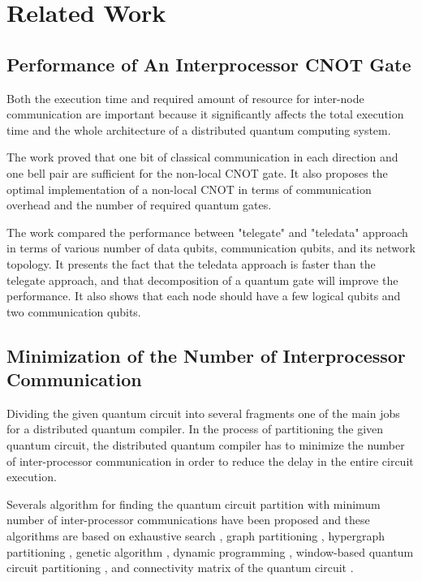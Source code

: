 \chapter{Related Work}
\label{related works}

\section{Performance of  An Interprocessor CNOT Gate}
Both the execution time and required amount of resource for inter-node communication are important because it significantly affects the total execution time and the whole architecture of a distributed quantum computing system. 

 The work \cite{gateteleportation} proved that one bit of classical communication in each direction and one bell pair are sufficient for the non-local CNOT gate.  It also proposes the optimal implementation of a non-local CNOT in terms of communication overhead and the number of required quantum gates. 
 
 The work \cite{arithmetic} compared the performance between "telegate" and "teledata" approach in terms of various number of data qubits, communication qubits, and its network topology.  It presents the fact that the teledata approach is faster than the telegate approach, and that decomposition of a quantum gate will improve the performance.  It also shows that each node should have a few logical qubits and two communication qubits.

\section{Minimization of the Number of Interprocessor Communication}

Dividing the given quantum circuit into several fragments one of the main jobs for a distributed quantum compiler.  In the process of partitioning the given quantum circuit, the distributed quantum compiler has to minimize the number of inter-processor communication in order to reduce the delay in the entire circuit execution.  

Severals algorithm for finding the quantum circuit partition with minimum number of inter-processor communications have been proposed and these algorithms are based on exhaustive search  \cite{exhaustivesearch}, graph partitioning \cite{Kernighahn-Lin}, hypergraph partitioning \cite{hypergraph}, genetic algorithm \cite{genetic}, dynamic programming \cite{dynamic}, window-based quantum circuit partitioning \cite{WQCP} , and connectivity matrix of the quantum circuit \cite{matrix}.

